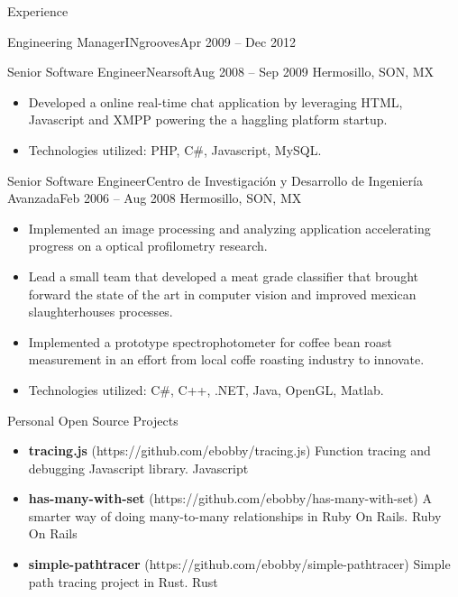 \documentclass[]{mcdowellcv}
\begin{document}
\begin{cvsection}{Experience}
\begin{cvsubsection}{Engineering Manager}{INgrooves}{Apr 2009 -- Dec 2012}
	\end{cvsubsection}
	\begin{cvsubsection}{Senior Software Engineer}{Nearsoft}{Aug 2008 -- Sep 2009}
		Hermosillo, SON, MX
		\begin{itemize}%
			\item Developed a online real-time chat application by leveraging HTML, Javascript and XMPP powering the a haggling platform startup.
			\item Technologies utilized: PHP, C\#, Javascript, MySQL.
		\end{itemize}
	\end{cvsubsection}
	\begin{cvsubsection}{Senior Software Engineer}{Centro de Investigación y Desarrollo de Ingeniería Avanzada}{Feb 2006 -- Aug 2008}
		Hermosillo, SON, MX
		\begin{itemize}%
			\item Implemented an image processing and analyzing application accelerating progress on a optical profilometry research.
			\item Lead a small team that developed a meat grade classifier that brought forward the state of the art in computer vision and improved mexican slaughterhouses processes.
			\item Implemented a prototype spectrophotometer for coffee bean roast measurement in an effort from local coffe roasting industry to innovate.
			\item Technologies utilized: C\#, C++, .NET, Java, OpenGL, Matlab.
		\end{itemize}
	\end{cvsubsection}
\end{cvsection}
\begin{cvsection}{Personal Open Source Projects}
	\begin{cvsubsection}{}{}{}
		\begin{itemize}
			\setlength\itemsep{3pt}
			\item \textbf{tracing.js} (https://github.com/ebobby/tracing.js)  Function tracing and debugging Javascript library. Javascript
			\item \textbf{has-many-with-set} (https://github.com/ebobby/has-many-with-set)  A smarter way of doing many-to-many relationships in Ruby On Rails. Ruby On Rails
			\item \textbf{simple-pathtracer} (https://github.com/ebobby/simple-pathtracer)  Simple path tracing project in Rust. Rust
		\end{itemize}
	\end{cvsubsection}
\end{cvsection}
\end{document}
